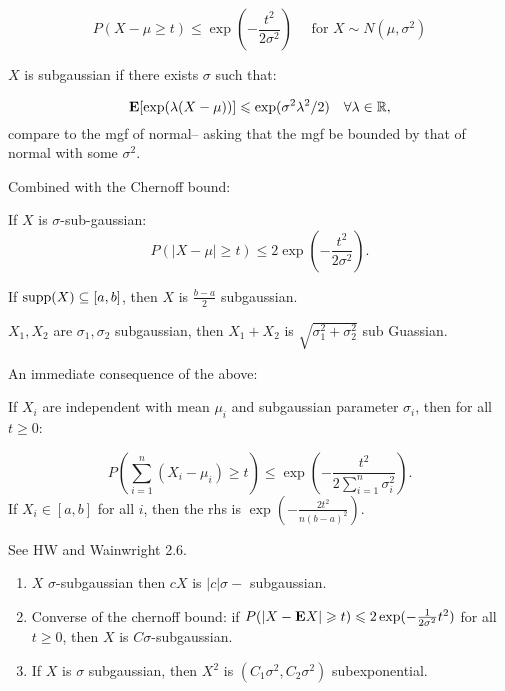 \documentclass{article}
\begin{document}
$$\boxed{P(X-\mu\geq t) \leq \exp(-\frac{t^2}{2\sigma^2})} \quad \text{ for } X\sim N(\mu,\sigma^2)$$

\begin{definition}
$X$ is subgaussian if there exists $\sigma$ such that:

$$\mathbf{E}[\exp(\lambda(X-\mu))] \leqslant \exp(\sigma^2 \lambda^2/2) \quad \forall \lambda\in\mathbb R,$$
compare to the mgf of normal-- asking that the mgf be bounded by that of normal with some $\sigma^2$. 
\end{definition}

Combined with the Chernoff bound:

\begin{theorem}
If $X$ is $\sigma$-sub-gaussian:
$$P(|X-\mu|\geq t) \leq 2\exp(-\frac{t^2}{2\sigma^2}).$$


\end{theorem}
\begin{example}
If $\mathrm{supp} (X) \subseteq [a,b]$, then $X$ is $\frac{b-a}{2}$ subgaussian.
\end{example}

\begin{fact}
$X_1, X_2$ are $\sigma_1, \sigma_2$ subgaussian, then $X_1 + X_2$ is $\sqrt{ \sigma_1^2 + \sigma_2^2 }$ sub Guassian. 


\end{fact}
An immediate consequence of the above:
\begin{theorem}
If $X_i$ are independent with mean $\mu_i$ and subgaussian parameter $\sigma_i$, then for all $t\geq 0$:

$$P(\sum_{i=1}^n (X_i - \mu_i) \geq t) \leq \exp(-\frac{t^2}{2\sum_{i=1}^n \sigma_i^2}).$$
If $X_i \in [a,b]$ for all $i$, then the rhs is $\exp(-\frac{2t^2}{n(b-a)^2})$.
\end{theorem}
\begin{fact}
See HW and Wainwright 2.6.
\begin{enumerate}
	\item $X$ $\sigma$-subgaussian then $cX$ is $|c|\sigma-$ subgaussian. 
	\item Converse of the chernoff bound: if $P(|X-\mathbf{E} X|\geqslant t) \leqslant 2\exp(-\frac{1}{2\sigma^2} t^2)$ for all $t\geq 0$, then $X$ is $C\sigma$-subgaussian.
	\item If $X$ is $\sigma$ subgaussian, then $X^2$ is $(C_1 \sigma^2, C_2 \sigma^2)$ subexponential. 
\end{enumerate}
\end{fact}
\end{document}
